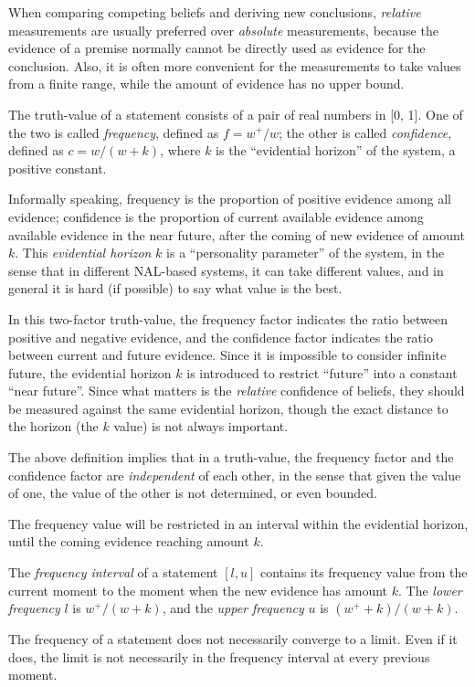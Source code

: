 When comparing competing beliefs and deriving new conclusions, {\em relative} measurements are usually preferred over {\em absolute} measurements, because the evidence of a premise normally cannot be directly used as evidence for the conclusion. Also, it is often more convenient for the measurements to take values from a finite range, while the amount of evidence has no upper bound. 

\begin{defi}
The truth-value of a statement consists of a pair of real numbers in [0, 1].  One of the two is called {\em frequency}, defined as \(f = w^+ / w\); the other is called {\em confidence}, defined as \(c = w / (w + k)\), where $k$ is the ``evidential horizon'' of the system, a positive constant.
\end{defi}
Informally speaking, frequency is the proportion of positive evidence among all evidence; confidence is the proportion of current available evidence among available evidence in the near future, after the coming of new evidence of amount $k$. This \emph{evidential horizon} $k$ is a ``personality parameter'' of the system, in the sense that in different NAL-based systems, it can take different values, and in general it is hard (if possible) to say what value is the best. 

In this two-factor truth-value, the frequency factor indicates the ratio between positive and negative evidence, and the confidence factor indicates the ratio between current and future evidence. Since it is impossible to consider infinite future, the evidential horizon $k$ is introduced to restrict ``future'' into a constant ``near future''. Since what matters is the \emph{relative} confidence of beliefs, they should be measured against the same evidential horizon, though the exact distance to the horizon (the $k$ value) is not always important.

The above definition implies that in a truth-value, the frequency factor and the confidence factor are \emph{independent} of each other, in the sense that given the value of one, the value of the other is not determined, or even bounded.

The frequency value will be restricted in an interval within the evidential horizon, until the coming evidence reaching amount $k$.
\begin{defi}
The \emph{frequency interval} of a statement \([l, u]\) contains its frequency value from the current moment to the moment when the new evidence has amount $k$. The {\em lower frequency} $l$ is $w^+/(w+k)$, and the {\em upper frequency} $u$ is $(w^++k)/(w+k)$. 
\end{defi}
The frequency of a statement does not necessarily converge to a limit. Even if it does, the limit is not necessarily in the frequency interval at every previous moment.

